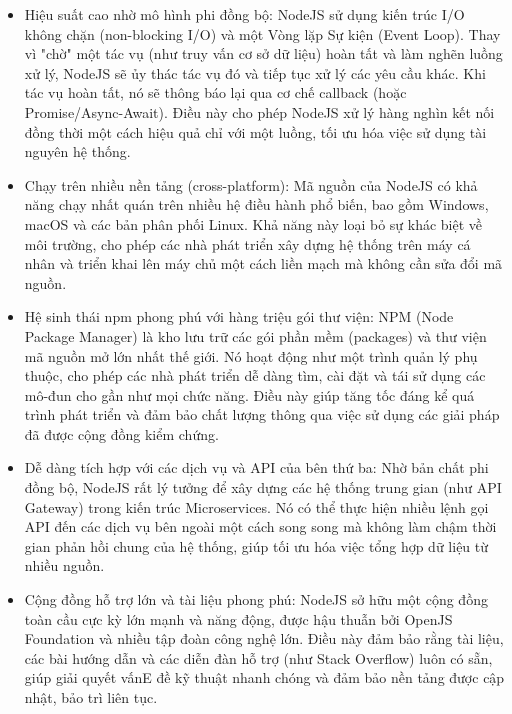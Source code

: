\begin{itemize}
    \item[-] Hiệu suất cao nhờ mô hình phi đồng bộ: NodeJS sử dụng kiến trúc I/O không chặn (non-blocking I/O) và một Vòng lặp Sự kiện (Event Loop). Thay vì "chờ" một tác vụ (như truy vấn cơ sở dữ liệu) hoàn tất và làm nghẽn luồng xử lý, NodeJS sẽ ủy thác tác vụ đó và tiếp tục xử lý các yêu cầu khác. Khi tác vụ hoàn tất, nó sẽ thông báo lại qua cơ chế callback (hoặc Promise/Async-Await). Điều này cho phép NodeJS xử lý hàng nghìn kết nối đồng thời một cách hiệu quả chỉ với một luồng, tối ưu hóa việc sử dụng tài nguyên hệ thống.
    \item[-] Chạy trên nhiều nền tảng (cross-platform): Mã nguồn của NodeJS có khả năng chạy nhất quán trên nhiều hệ điều hành phổ biến, bao gồm Windows, macOS và các bản phân phối Linux. Khả năng này loại bỏ sự khác biệt về môi trường, cho phép các nhà phát triển xây dựng hệ thống trên máy cá nhân và triển khai lên máy chủ một cách liền mạch mà không cần sửa đổi mã nguồn.
    \item[-] Hệ sinh thái npm phong phú với hàng triệu gói thư viện: NPM (Node Package Manager) là kho lưu trữ các gói phần mềm (packages) và thư viện mã nguồn mở lớn nhất thế giới. Nó hoạt động như một trình quản lý phụ thuộc, cho phép các nhà phát triển dễ dàng tìm, cài đặt và tái sử dụng các mô-đun cho gần như mọi chức năng. Điều này giúp tăng tốc đáng kể quá trình phát triển và đảm bảo chất lượng thông qua việc sử dụng các giải pháp đã được cộng đồng kiểm chứng.
    \item[-] Dễ dàng tích hợp với các dịch vụ và API của bên thứ ba: Nhờ bản chất phi đồng bộ, NodeJS rất lý tưởng để xây dựng các hệ thống trung gian (như API Gateway) trong kiến trúc Microservices. Nó có thể thực hiện nhiều lệnh gọi API đến các dịch vụ bên ngoài một cách song song mà không làm chậm thời gian phản hồi chung của hệ thống, giúp tối ưu hóa việc tổng hợp dữ liệu từ nhiều nguồn.
    \item[-] Cộng đồng hỗ trợ lớn và tài liệu phong phú: NodeJS sở hữu một cộng đồng toàn cầu cực kỳ lớn mạnh và năng động, được hậu thuẫn bởi OpenJS Foundation và nhiều tập đoàn công nghệ lớn. Điều này đảm bảo rằng tài liệu, các bài hướng dẫn và các diễn đàn hỗ trợ (như Stack Overflow) luôn có sẵn, giúp giải quyết vấnE đề kỹ thuật nhanh chóng và đảm bảo nền tảng được cập nhật, bảo trì liên tục.
\end{itemize}

